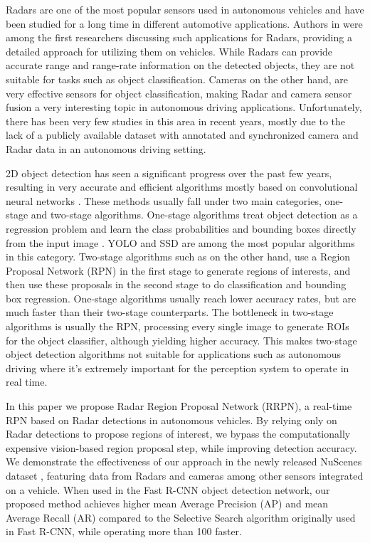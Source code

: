 \documentclass{article}
\newcommand{\dataset}{NuScenes }
\begin{document}
Radars are one of the most popular sensors used in autonomous vehicles and have been 
studied for a long time in different automotive applications. Authors in 
\cite{Grimes1974} were among the first researchers 
discussing such applications for Radars, providing a detailed approach for utilizing them 
on vehicles. While Radars can provide accurate range and range-rate information on the 
detected objects, they are not suitable for tasks such as object classification. 
Cameras on the other hand, are very effective sensors 
for object classification, making Radar and camera sensor fusion a very 
interesting topic in autonomous driving applications. Unfortunately, there has been 
very few studies in this area in recent years, mostly due to the lack of a publicly available 
dataset with annotated and synchronized camera and Radar data in an autonomous driving 
setting.

2D object detection has seen a significant progress over the past few years, resulting in 
very accurate and efficient algorithms mostly based on convolutional neural networks 
\cite{Girshick2015,rfcn2016r,ren2015faster,liu2016ssd}. These methods usually fall under two 
main categories, one-stage and two-stage algorithms. One-stage algorithms treat object 
detection as a regression problem and learn the class probabilities and bounding boxes 
directly from the input image \cite{soviany2018optimizing}. YOLO \cite{redmon2016YOLO} and 
SSD \cite{liu2016ssd} are among the most popular algorithms in this category. Two-stage 
algorithms such as \cite{Girshick2015,ren2015faster} on the other hand, use a Region Proposal 
Network (RPN) in the first stage to generate regions of interests, and then use these 
proposals in the second stage to do classification and bounding box regression. 
One-stage algorithms usually reach lower accuracy rates, but are much faster than 
their two-stage counterparts. The bottleneck in two-stage 
algorithms is usually the RPN, processing every single image to generate ROIs for the object classifier, although yielding higher accuracy. This 
makes two-stage object detection algorithms not suitable for applications such as autonomous driving where 
it's extremely important for the perception system to operate in real time.

In this paper we propose Radar Region Proposal Network (RRPN), a real-time RPN based on Radar detections in autonomous 
vehicles. 
By relying only on Radar detections to propose regions of interest, we bypass the 
computationally expensive vision-based region proposal step, while improving detection 
accuracy. We demonstrate the effectiveness of our approach in the newly released 
\dataset dataset \cite{caesar2019nuscenes}, featuring data from Radars and cameras among 
other sensors integrated on a vehicle. When used in the Fast R-CNN object detection network, 
our proposed method achieves higher mean Average Precision (AP) and mean Average Recall 
(AR) compared to the Selective Search algorithm originally used in Fast R-CNN, while 
operating more than 100 faster.
\end{document}
